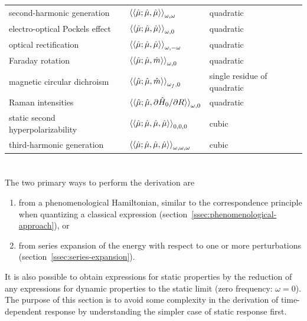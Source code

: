 \documentclass[%
class = book,%
crop = false,%
float = true,%
multi = true,%
preview = false,%
]{standalone}
\begin{document}
\begin{table}
\begin{tabular}{lll}
    second-harmonic generation        & \( \braket{\braket{\hat{\mu};\hat{\mu},\hat{\mu}}}_{\omega,\omega} \)                  & quadratic \\
    electro-optical Pockels effect    & \( \braket{\braket{\hat{\mu};\hat{\mu},\hat{\mu}}}_{\omega,0} \)                       & quadratic \\
    optical rectification             & \( \braket{\braket{\hat{\mu};\hat{\mu},\hat{\mu}}}_{\omega,-\omega} \)                 & quadratic \\
    Faraday rotation                  & \( \braket{\braket{\hat{\mu};\hat{\mu},\hat{m}}}_{\omega,0} \)                         & quadratic \\
    magnetic circular dichroism       & \( \braket{\braket{\hat{\mu};\hat{\mu},\hat{m}}}_{\omega_{f},0} \)                     & single residue of quadratic \\
    Raman intensities                 & \( \braket{\braket{\hat{\mu};\hat{\mu},\partial\hat{H}_{0}/\partial R}}_{\omega,0} \)  & quadratic \\
    \midrule
    static second hyperpolarizability & \( \braket{\braket{\hat{\mu};\hat{\mu},\hat{\mu},\hat{\mu}}}_{0,0,0} \)                & cubic \\
    third-harmonic generation         & \( \braket{\braket{\hat{\mu};\hat{\mu},\hat{\mu},\hat{\mu}}}_{\omega,\omega,\omega} \) & cubic \\
    \bottomrule
  \end{tabular}
\end{table}

\section{\texorpdfstring{}{Static (time-independent) response properties}}
\label{sec:static-properties}

The two primary ways to perform the derivation are
\begin{enumerate}
\item from a phenomenological Hamiltonian, similar to the correspondence principle when quantizing a classical expression (section~\ref{ssec:phenomenological-approach}), or
\item from series expansion of the energy with respect to one or more perturbations (section~\ref{ssec:series-expansion}).
\end{enumerate}
It is also possible to obtain expressions for static properties by the reduction of any expressions for dynamic properties to the static limit (zero frequency: \(\omega = 0\)). The purpose of this section is to avoid some complexity in the derivation of time-dependent response by understanding the simpler case of static response first.
\end{document}
